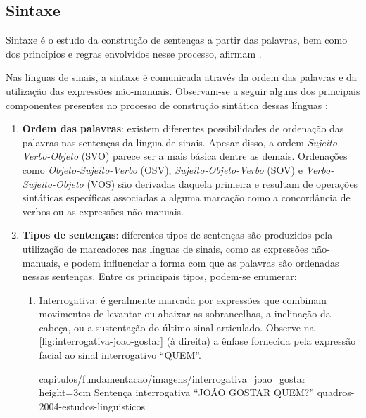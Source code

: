 \subsection{Sintaxe}
\label{sec:linguistica-sintaxe}

Sintaxe é o estudo da construção de sentenças a partir das palavras, bem como dos princípios e regras envolvidos nesse processo, afirmam .

Nas línguas de sinais, a sintaxe é comunicada através da ordem das palavras e da utilização das expressões não-manuais.
Observam-se a seguir alguns dos principais componentes presentes no processo de construção sintática dessas línguas \cite{jay-2011-dont-just-sign,hill-2019-sign-languages,quadros-2004-estudos-linguisticos}:

\begin{enumerate}
    \item \textbf{Ordem das palavras}: existem diferentes possibilidades de ordenação das palavras nas sentenças da língua de sinais. Apesar disso, a ordem \textit{Sujeito-Verbo-Objeto} (SVO) parece ser a mais básica dentre as demais.
          Ordenações como \textit{Objeto-Sujeito-Verbo} (OSV), \textit{Sujeito-Objeto-Verbo} (SOV) e \textit{Verbo-Sujeito-Objeto} (VOS) são derivadas daquela primeira e resultam de operações sintáticas específicas associadas a alguma marcação como a concordância de verbos ou as expressões não-manuais.


    \item \textbf{Tipos de sentenças}: diferentes tipos de sentenças são produzidos pela utilização de marcadores nas línguas de sinais, como as expressões não-manuais, e podem influenciar a forma com que as palavras são ordenadas nessas sentenças.
          Entre os principais tipos, podem-se enumerar:

          \begin{enumerate}
              \item \underline{Interrogativa}: é geralmente marcada por expressões que combinam movimentos de levantar ou abaixar as sobrancelhas, a inclinação da cabeça, ou a sustentação do último sinal articulado.
                    Observe na \autoref{fig:interrogativa-joao-gostar} (à direita) a ênfase fornecida pela expressão facial ao sinal interrogativo ``QUEM''.

                    {capitulos/fundamentacao/imagens/interrogativa_joao_gostar} %
                    {height=3cm} %
                    {Sentença interrogativa ``JOÃO GOSTAR QUEM?''} %
                    {quadros-2004-estudos-linguisticos} %



\end{enumerate}
\end{enumerate}

